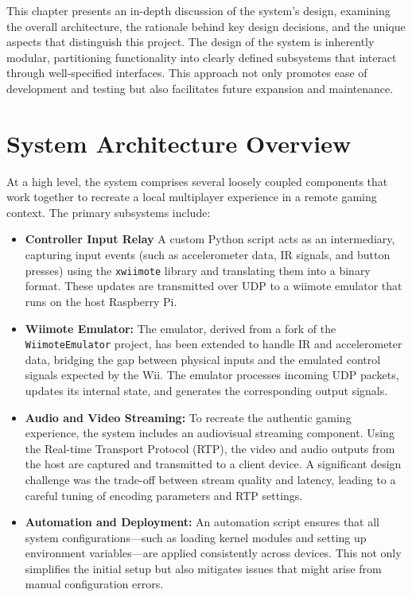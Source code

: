 \label{chapter:design}

This chapter presents an in-depth discussion of the system's design, examining the overall architecture, the rationale behind key design decisions, and the unique aspects that distinguish this project. The design of the system is inherently modular, partitioning functionality into clearly defined subsystems that interact through well-specified interfaces. This approach not only promotes ease of development and testing but also facilitates future expansion and maintenance.

\section{System Architecture Overview}

At a high level, the system comprises several loosely coupled components that work together to recreate a local multiplayer experience in a remote gaming context. The primary subsystems include:

\begin{itemize}
    \item \textbf{Controller Input Relay}
          A custom Python script acts as an intermediary, capturing input events (such as accelerometer data, IR signals, and button presses) using the \texttt{xwiimote} library\cite{xwiimote} and translating them into a binary format. These updates are transmitted over UDP to a wiimote emulator that runs on the host Raspberry Pi.

\item \textbf{Wiimote Emulator:}
The emulator, derived from a fork\cite{jr_wiimote_emu} of the \texttt{WiimoteEmulator} project\cite{wiimote_emulator}, has been extended to handle IR and accelerometer data, bridging the gap between physical inputs and the emulated control signals expected by the Wii. The emulator processes incoming UDP packets, updates its internal state, and generates the corresponding output signals.

    \item \textbf{Audio and Video Streaming:}
          To recreate the authentic gaming experience, the system includes an audiovisual streaming component. Using the Real-time Transport Protocol (RTP), the video and audio outputs from the host are captured and transmitted to a client device. A significant design challenge was the trade-off between stream quality and latency, leading to a careful tuning of encoding parameters and RTP settings.

    \item \textbf{Automation and Deployment:}
          An automation script ensures that all system configurations—such as loading kernel modules and setting up environment variables—are applied consistently across devices. This not only simplifies the initial setup but also mitigates issues that might arise from manual configuration errors.
\end{itemize}

